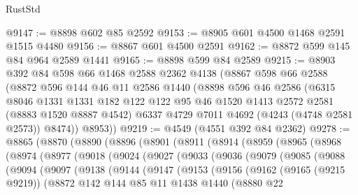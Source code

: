 \begin{lexlean}{RustStd}
\begin{coremodule}
@9147 := @8898 @602 @85 @2592
@9153 := @8905 @601 @4500 @1468 @2591 @1515 @4480
@9156 := @8867 @601 @4500 @2591
@9162 := @8872 @599 @145 @84 @964 @2589 @1441
@9165 := @8898 @599 @84 @2589
@9215 := @8903
    @392
    @84
    @598
    @66
    @1468
    @2588
    @2362
    @4138
    (@8867
      @598
      @66
      @2588
      (@8872
        @596
        @144
        @46
        @11
        @2586
        @1440
        (@8898
          @596
          @46
          @2586
          (@6315
            @8046
            @1331
            @1331
            @182
            @122
            @122
            @95
            @46
            @1520
            @1413
            @2572
            @2581
            (@8883 @1520 @8887 @4542)
            @6337
            @4729
            @7011
            @4692
            (@4243 (@4748 @2581 @2573))
            @8474))
        @8953))
@9219 := @4549 (@4551 @392 @84 @2362)
@9278 := @8865
    (@8870
      (@8890
        (@8896
          (@8901
            (@8911
              (@8914
                (@8959
                  (@8965
                    (@8968
                      (@8974
                        (@8977
                          (@9018
                            (@9024
                              (@9027
                                (@9033
                                  (@9036
                                    (@9079
                                      (@9085
                                        (@9088
                                          (@9094
                                            (@9097
                                              (@9138
                                                (@9144
                                                  (@9147
                                                    (@9153
                                                      (@9156
                                                        (@9162
                                                          (@9165 (@9215 @9219))
                                                          (@8872
                                                            @142
                                                            @144
                                                            @85
                                                            @11
                                                            @1438
                                                            @1440
                                                            (@8880
                                                              @22

\end{coremodule}
\end{lexlean}
